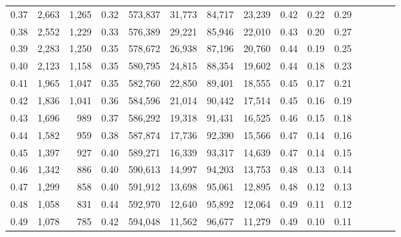 \begin{tabular}{rrrcrrrrrrrrrrr}
0.37 &   2,663 &  1,265 &                                       0.32 &  573,837 &   31,773 &   84,717 &   23,239 &  0.42 &  0.22 &                         0.29 \\
0.38 &   2,552 &  1,229 &                                       0.33 &  576,389 &   29,221 &   85,946 &   22,010 &  0.43 &  0.20 &                         0.27 \\
0.39 &   2,283 &  1,250 &                                       0.35 &  578,672 &   26,938 &   87,196 &   20,760 &  0.44 &  0.19 &                         0.25 \\
0.40 &   2,123 &  1,158 &                                       0.35 &  580,795 &   24,815 &   88,354 &   19,602 &  0.44 &  0.18 &                         0.23 \\
0.41 &   1,965 &  1,047 &                                       0.35 &  582,760 &   22,850 &   89,401 &   18,555 &  0.45 &  0.17 &                         0.21 \\
0.42 &   1,836 &  1,041 &                                       0.36 &  584,596 &   21,014 &   90,442 &   17,514 &  0.45 &  0.16 &                         0.19 \\
0.43 &   1,696 &    989 &                                       0.37 &  586,292 &   19,318 &   91,431 &   16,525 &  0.46 &  0.15 &                         0.18 \\
0.44 &   1,582 &    959 &                                       0.38 &  587,874 &   17,736 &   92,390 &   15,566 &  0.47 &  0.14 &                         0.16 \\
0.45 &   1,397 &    927 &                                       0.40 &  589,271 &   16,339 &   93,317 &   14,639 &  0.47 &  0.14 &                         0.15 \\
0.46 &   1,342 &    886 &                                       0.40 &  590,613 &   14,997 &   94,203 &   13,753 &  0.48 &  0.13 &                         0.14 \\
0.47 &   1,299 &    858 &                                       0.40 &  591,912 &   13,698 &   95,061 &   12,895 &  0.48 &  0.12 &                         0.13 \\
0.48 &   1,058 &    831 &                                       0.44 &  592,970 &   12,640 &   95,892 &   12,064 &  0.49 &  0.11 &                         0.12 \\
0.49 &   1,078 &    785 &                                       0.42 &  594,048 &   11,562 &   96,677 &   11,279 &  0.49 &  0.10 &                         0.11 \\

\end{tabular}
